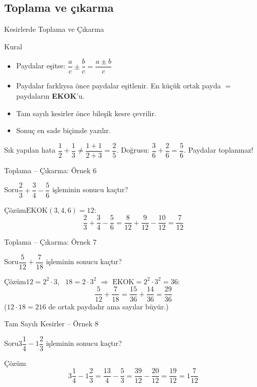 \documentclass[aspectratio=169,11pt]{beamer}
\newcommand{\soru}[3]{%
\begin{frame}{#1}
  \begin{block}{Soru}\large #2\end{block}
  \pause
  \begin{exampleblock}{Çözüm}\large #3\end{exampleblock}
\end{frame}}
\begin{document}
\subsection{Toplama ve çıkarma}
\begin{frame}{Kesirlerde Toplama ve Çıkarma}
\begin{block}{Kural}
\begin{itemize}
\item Paydalar eşitse: \(\dfrac{a}{c}\pm\dfrac{b}{c}=\dfrac{a\pm b}{c}\)
\item Paydalar farklıysa önce paydalar eşitlenir. En küçük ortak payda \(=\) paydaların \textbf{EKOK}'u.
\item Tam sayılı kesirler önce bileşik kesre çevrilir.
\item Sonuç en sade biçimde yazılır.
\end{itemize}
\end{block}
\begin{alertblock}{Sık yapılan hata}
\(\dfrac{1}{2}+\dfrac{1}{3}\neq\dfrac{1+1}{2+3}=\dfrac{2}{5}\). \quad Doğrusu: \(\dfrac{3}{6}+\dfrac{2}{6}=\dfrac{5}{6}\). \quad Paydalar toplanmaz!
\end{alertblock}
\end{frame}

\soru{Toplama -- Çıkarma: Örnek 6}
{\(\dfrac{2}{3}+\dfrac{3}{4}-\dfrac{5}{6}\) işleminin sonucu kaçtır?}
{\(\text{EKOK}(3,4,6)=12\):
\[\frac{2}{3}+\frac{3}{4}-\frac{5}{6}=\frac{8}{12}+\frac{9}{12}-\frac{10}{12}=\frac{7}{12}\]}

\soru{Toplama -- Çıkarma: Örnek 7}
{\(\dfrac{5}{12}+\dfrac{7}{18}\) işleminin sonucu kaçtır?}
{\(12=2^2\cdot 3\), \ \(18=2\cdot 3^2\) \(\Rightarrow\) \(\text{EKOK}=2^2\cdot 3^2=36\):
\[\frac{5}{12}+\frac{7}{18}=\frac{15}{36}+\frac{14}{36}=\frac{29}{36}\]
(\(12\cdot 18=216\) de ortak paydadır ama sayılar büyür.)}

\soru{Tam Sayılı Kesirler -- Örnek 8}
{\(3\dfrac{1}{4}-1\dfrac{2}{3}\) işleminin sonucu kaçtır?}
{\[3\frac{1}{4}-1\frac{2}{3}=\frac{13}{4}-\frac{5}{3}=\frac{39}{12}-\frac{20}{12}=\frac{19}{12}=1\frac{7}{12}\]}
\end{document}
